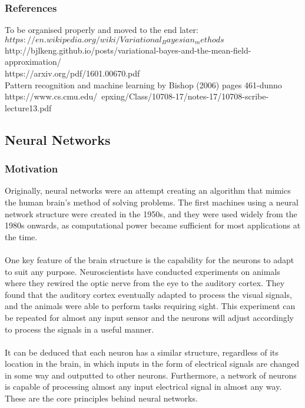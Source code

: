 \documentclass[a4paper,12pt]{article}
\begin{document}
\subsubsection{References}
To be organised properly and moved to the end later:\\
$https://en.wikipedia.org/wiki/Variational_Bayesian_methods$ \\
http://bjlkeng.github.io/posts/variational-bayes-and-the-mean-field-approximation/ \\
https://arxiv.org/pdf/1601.00670.pdf \\
Pattern recognition and machine learning by Bishop (2006) pages 461-dunno \\
https://www.cs.cmu.edu/~epxing/Class/10708-17/notes-17/10708-scribe-lecture13.pdf \\
\newpage
\subsection{Neural Networks}
\subsubsection{Motivation}
Originally, neural networks were an attempt creating an algorithm that mimics the human brain's method of solving problems. The first machines using a neural network structure were created in the 1950s, and they were used widely from the 1980s onwards, as computational power became sufficient for most applications at the time.\\
\\
One key feature of the brain structure is the capability for the neurons to adapt to suit any purpose. Neuroscientists have conducted experiments on animals where they rewired the optic nerve from the eye to the auditory cortex. They found that the auditory cortex eventually adapted to process the visual signals, and the animals were able to perform tasks requiring sight. This experiment can be repeated for almost any input sensor and the neurons will adjust accordingly to process the signals in a useful manner.\\
\\
It can be deduced that each neuron has a similar structure, regardless of its location in the brain, in which inputs in the form of electrical signals are changed in some way and outputted to other neurons. Furthermore, a network of neurons is capable of processing almost any input electrical signal in almost any way. These are the core principles behind neural networks.
\end{document}

